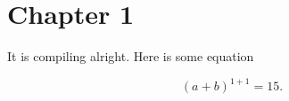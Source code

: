 \section{Chapter 1}\label{sec:ch1}

It is compiling alright. Here is some equation

\begin{equation}
\label{eq:ch12}
\left( a +b \right)^{1+1} = 15
.\end{equation}
